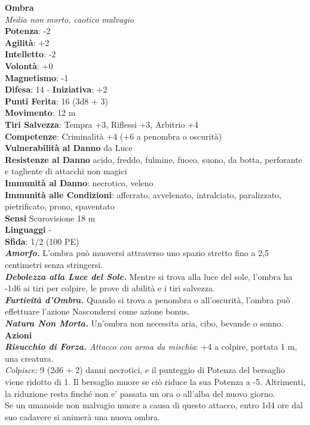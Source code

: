 \begin{multicols}{2}
\medskip\textbf{Ombra}\\
\emph{Media non morto, caotico malvagio}\\
\textbf{Potenza}: -2\\
\textbf{Agilità}: +2\\
\textbf{Intelletto}: -2\\
\textbf{Volontà}: +0\\
\textbf{Magnetismo}: -1\\
\textbf{Difesa}: 14 - \textbf{Iniziativa}: +2\\
\textbf{Punti Ferita}: 16 (3d8 + 3)\\
\textbf{Movimento}: 12 m\\
\textbf{Tiri Salvezza}: Tempra +3, Riflessi +3, Arbitrio +4\\
\textbf{Competenze}: Criminalità +4 (+6 a penombra o oscurità)\\
\textbf{Vulnerabilità al Danno} da Luce\\
\textbf{Resistenze al Danno} acido, freddo, fulmine, fuoco, suono, da botta, perforante e tagliente di attacchi non magici\\
\textbf{Immunità al Danno}: necrotico, veleno\\
\textbf{Immunità alle Condizioni}: afferrato, avvelenato, intralciato, paralizzato, pietrificato, prono, spaventato\\
\textbf{Sensi} Scurovisione 18 m\\
\textbf{Linguaggi} -\\
\textbf{Sfida}: 1/2 (100 PE)\smallskip\\
\emph{\textbf{Amorfo.}} L'ombra può muoversi attraverso uno spazio stretto fino a 2,5 centimetri senza stringersi. \\
\emph{\textbf{Debolezza alla Luce del Sole.}} Mentre si trova alla luce del sole, l'ombra ha -1d6 ai tiri per colpire, le prove di abilità e i tiri salvezza.\\
\emph{\textbf{Furtività d'Ombra.}} Quando si trova a penombra o all'oscurità, l'ombra può effettuare l'azione Nascondersi come azione bonus.\\
\emph{\textbf{Natura Non Morta.}} Un'ombra non necessita aria, cibo, bevande o sonno.\\
\smallskip\textbf{Azioni}\\
\emph{\textbf{Risucchio di Forza.} Attacco con arma da mischia}: +4 a colpire, portata 1 m, una creatura.\\
\emph{Colpisce:} 9 (2d6 + 2) danni necrotici, e il punteggio di Potenza del bersaglio viene ridotto di 1.  Il bersaglio muore se ciò riduce la sua Potenza a -5. Altrimenti, la riduzione resta finché non e' passata un ora o all'alba del nuovo giorno.\\
Se un umanoide non malvagio muore a causa di questo attacco, entro 1d4 ore dal suo cadavere si animerà una nuova ombra.\\


\end{multicols}
